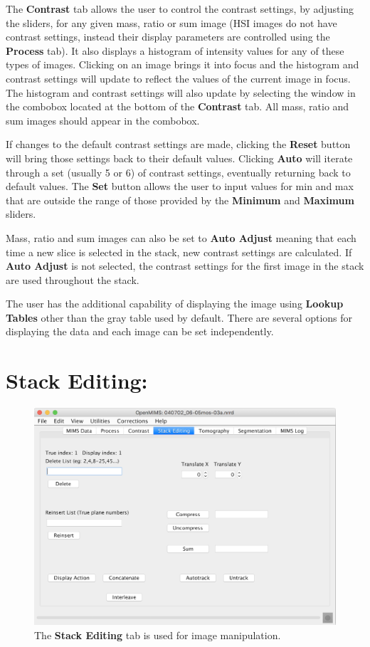 \documentclass{article}
\begin{document}
	The \textbf{Contrast} tab allows the user to control the contrast settings, by adjusting 
	the sliders, for any given mass,
	ratio or sum image (HSI images do not have contrast settings, instead their display
	parameters are controlled using the \textbf{Process} tab).
	It also displays a histogram of intensity values for any of these types of images.
	Clicking on an image brings it into focus and the histogram and
	contrast settings will update to reflect the values of the current image in focus.
	The histogram and contrast settings will also update by selecting the window in the
	combobox located at the bottom of the \textbf{Contrast} tab. All mass, ratio and sum images
	should appear in the combobox.

	If changes to the default contrast settings are made, clicking the \textbf{Reset} button will
	bring those settings back to their default values. Clicking \textbf{Auto} will
	iterate through a set (usually 5 or 6) of contrast settings, eventually returning
	back to default values. The \textbf{Set} button allows the user to input values for min and
	max that are outside the range of those provided by the \textbf{Minimum} 
	and \textbf{Maximum} sliders.

	Mass, ratio and sum images can also be set to \textbf{Auto Adjust} meaning that
	each time a new slice is selected in the stack, new contrast settings are calculated.
	If \textbf{Auto Adjust} is not selected, the contrast settings for the first image
	in the stack are used throughout the stack.

	The user has the additional capability of displaying the image using \textbf{Lookup
	Tables} other than the gray table used by default. There are several options for
	displaying the data and each image can be set independently.


\newpage 
\section*{Stack Editing:}
	
	\begin{figure}[ht]
	\centering
	\includegraphics[scale=0.65]{snapshot_MimsStackEditing.png}
	\caption{The \textbf{Stack Editing} tab is used for image manipulation.}
	\end{figure}
	
\end{document}
